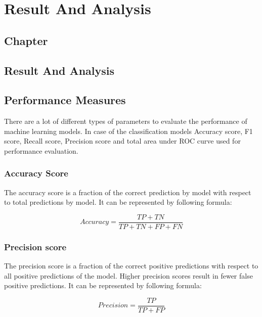 \thispagestyle{fancy}
\chapter{Result And Analysis} \label{ch:result_and_analysis}
\section*{\centering Chapter \thechapter}
\section*{\centering Result And Analysis}


\section{Performance Measures} \label{sec:performance_measures}
There are a lot of different types of parameters to evaluate the performance of machine learning models. In case of the classification models Accuracy score, F1 score, Recall score, Precision score and total area under ROC curve used for performance evaluation.

\subsection{Accuracy Score}\label{subsec:accuracy_score}
The accuracy score is a fraction of the correct prediction by model with respect to total predictions by model. It can be represented by following formula:

\begin{equation}\label{eq:accuracy_score}
  Accuracy = \frac{TP+TN}{TP+TN+FP+FN}
\end{equation}

\subsection{Precision score}\label{subsec:precision_score}
The precision score is a fraction of the correct positive predictions with respect to all positive predictions of the model. Higher precision scores result in fewer false positive predictions. It can be represented by following formula:

\begin{equation}\label{eq:precision_score}
  Precision = \frac{TP}{TP+FP}
\end{equation}

